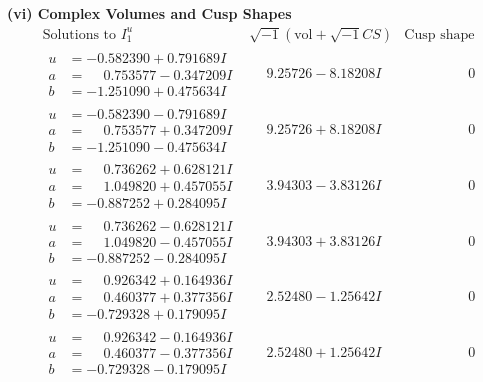 \documentclass[1p]{elsarticle_modified}
\theoremstyle{definition}
\newcommand{\I}{\sqrt{-1}}
\begin{document}
\newpage\flushleft \textbf{(vi) Complex Volumes and Cusp Shapes}
$$\begin{array}{c|c|c}  
\text{Solutions to }I^u_{1}& \I (\text{vol} + \sqrt{-1}CS) & \text{Cusp shape}\\
 \hline 
\begin{aligned}
u &= -0.582390 + 0.791689 I \\
a &= \phantom{-}0.753577 - 0.347209 I \\
b &= -1.251090 + 0.475634 I\end{aligned}
 & \phantom{-}9.25726 - 8.18208 I & \phantom{-0.000000 } 0 \\ \hline\begin{aligned}
u &= -0.582390 - 0.791689 I \\
a &= \phantom{-}0.753577 + 0.347209 I \\
b &= -1.251090 - 0.475634 I\end{aligned}
 & \phantom{-}9.25726 + 8.18208 I & \phantom{-0.000000 } 0 \\ \hline\begin{aligned}
u &= \phantom{-}0.736262 + 0.628121 I \\
a &= \phantom{-}1.049820 + 0.457055 I \\
b &= -0.887252 + 0.284095 I\end{aligned}
 & \phantom{-}3.94303 - 3.83126 I & \phantom{-0.000000 } 0 \\ \hline\begin{aligned}
u &= \phantom{-}0.736262 - 0.628121 I \\
a &= \phantom{-}1.049820 - 0.457055 I \\
b &= -0.887252 - 0.284095 I\end{aligned}
 & \phantom{-}3.94303 + 3.83126 I & \phantom{-0.000000 } 0 \\ \hline\begin{aligned}
u &= \phantom{-}0.926342 + 0.164936 I \\
a &= \phantom{-}0.460377 + 0.377356 I \\
b &= -0.729328 + 0.179095 I\end{aligned}
 & \phantom{-}2.52480 - 1.25642 I & \phantom{-0.000000 } 0 \\ \hline\begin{aligned}
u &= \phantom{-}0.926342 - 0.164936 I \\
a &= \phantom{-}0.460377 - 0.377356 I \\
b &= -0.729328 - 0.179095 I\end{aligned}
 & \phantom{-}2.52480 + 1.25642 I & \phantom{-0.000000 } 0 \\ \hline\begin{aligned}

\end{aligned}
\end{array}$$
\end{document}
